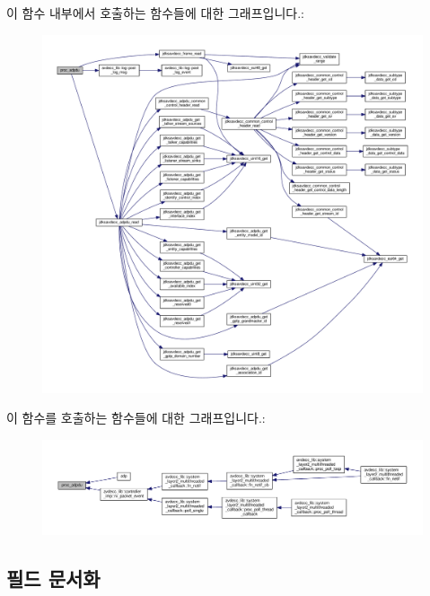 이 함수 내부에서 호출하는 함수들에 대한 그래프입니다.\+:
\nopagebreak
\begin{figure}[H]
\begin{center}
\leavevmode
\includegraphics[width=350pt]{classavdecc__lib_1_1adp_aa01b5685d3561b5c20763cad1a42f8a9_cgraph}
\end{center}
\end{figure}




이 함수를 호출하는 함수들에 대한 그래프입니다.\+:
\nopagebreak
\begin{figure}[H]
\begin{center}
\leavevmode
\includegraphics[width=350pt]{classavdecc__lib_1_1adp_aa01b5685d3561b5c20763cad1a42f8a9_icgraph}
\end{center}
\end{figure}




\subsection{필드 문서화}
